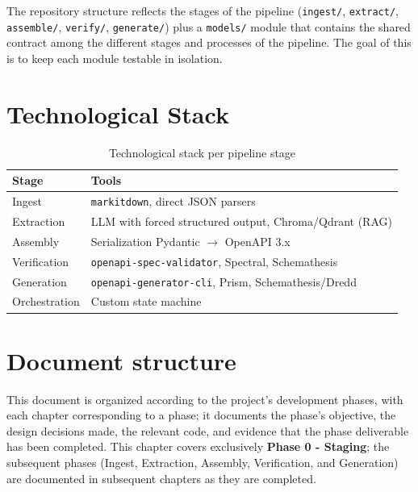 The repository structure reflects the stages of the pipeline
(\texttt{ingest/}, \texttt{extract/}, \texttt{assemble/}, \texttt{verify/},
\texttt{generate/}) plus a \texttt{models/} module that contains the 
shared contract among the different stages and processes of the pipeline.
The goal of this is to keep each module testable in isolation. 

\section{Technological Stack}

\begin{table}[h!]
\centering
\begin{tabular}{@{}ll@{}}
\toprule
\textbf{Stage} & \textbf{Tools} \\
\midrule
Ingest & \texttt{markitdown}, direct JSON parsers \\
Extraction & LLM with forced structured output, Chroma/Qdrant (RAG) \\
Assembly & Serialization Pydantic $\rightarrow$ OpenAPI 3.x \\
Verification & \texttt{openapi-spec-validator}, Spectral, Schemathesis \\
Generation & \texttt{openapi-generator-cli}, Prism, Schemathesis/Dredd \\
Orchestration & Custom state machine \\
\bottomrule
\end{tabular}
\caption{Technological stack per pipeline stage}
\end{table}

\section{Document structure}
This document is organized according to the project's development phases, 
with each chapter corresponding to a phase; it documents the phase's objective,
the design decisions made, the relevant code, and evidence that the phase deliverable
has been completed. This chapter covers exclusively \textbf{Phase 0 - Staging}; 
the subsequent phases (Ingest, Extraction, Assembly, Verification, and Generation) 
are documented in subsequent chapters as they are completed.

